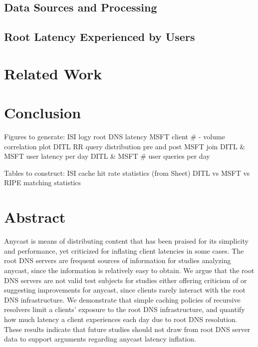 \documentclass[sigconf,nonacm,10pt]{acmart}
\begin{document}
\subsection{Data Sources and
Processing}\label{data-sources-and-processing}

\subsection{Root Latency Experienced by
Users}\label{root-latency-experienced-by-users}

\section{Related Work}\label{related-work}

\section{Conclusion}\label{conclusion}

\fi

Figures to generate: ISI logy root DNS latency MSFT client \# - volume
correlation plot DITL RR query distribution pre and post MSFT join DITL
\& MSFT user latency per day DITL \& MSFT \# user queries per day

Tables to construct: ISI cache hit rate statistics (from Sheet) DITL vs
MSFT vs RIPE matching statistics

\section*{Abstract}\label{abstract-1}

Anycast is means of distributing content that has been praised for its
simplicity and performance, yet criticized for inflating client
latencies in some cases. The root DNS servers are frequent sources of
information for studies analyzing anycast, since the information is
relatively easy to obtain. We argue that the root DNS servers are not
valid test subjects for studies either offering criticism of or
suggesting improvements for anycast, since clients rarely interact with
the root DNS infrastructure. We demonstrate that simple caching policies
of recursive resolvers limit a clients' exposure to the root DNS
infrastructure, and quantify how much latency a client experiences each
day due to root DNS resolution. These results indicate that future
studies should not draw from root DNS server data to support arguments
regarding anycast latency inflation.
\end{document}
